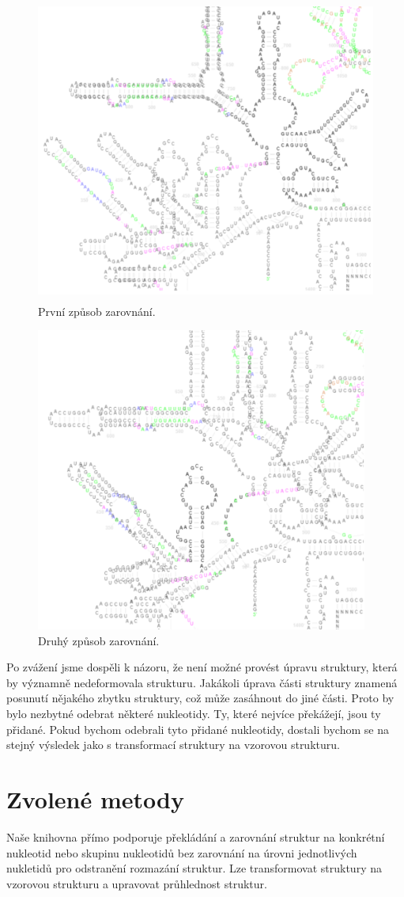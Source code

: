 \begin{figure}[H]
  \centering
  \includegraphics[height=100mm]{../img/kap02/tree/align1.png}
  \caption{První způsob zarovnání.}
\end{figure}

\begin{figure}[H]
  \centering
  \includegraphics[height=100mm]{../img/kap02/tree/align2.png}
  \caption{Druhý způsob zarovnání.}
\end{figure}

Po zvážení jsme dospěli k názoru, že není možné provést úpravu struktury, která
by významně nedeformovala strukturu. Jakákoli úprava části struktury znamená
posunutí nějakého zbytku struktury, což může zasáhnout do jiné části. Proto by
bylo nezbytné odebrat některé nukleotidy. Ty, které nejvíce překážejí, jsou ty
přidané. Pokud bychom odebrali tyto přidané nukleotidy, dostali bychom se na
stejný výsledek jako s transformací struktury na vzorovou strukturu.

\section{Zvolené metody}

Naše knihovna přímo podporuje překládání a zarovnání struktur na konkrétní
nukleotid nebo skupinu nukleotidů bez zarovnání na úrovni jednotlivých
nukletidů pro odstranění rozmazání struktur. Lze transformovat struktury na
vzorovou strukturu a upravovat průhlednost struktur.
